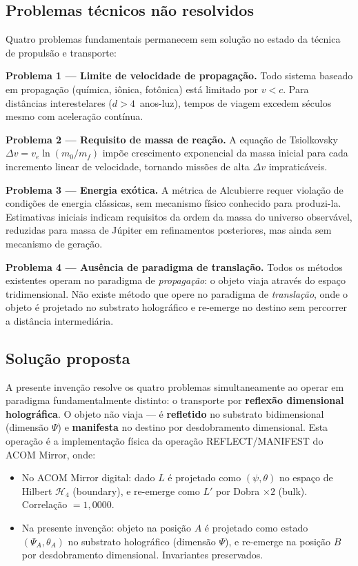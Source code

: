 \documentclass[12pt,a4paper]{article}
\begin{document}
\subsection{Problemas técnicos não resolvidos}

Quatro problemas fundamentais permanecem sem solução no estado
da técnica de propulsão e transporte:

\textbf{Problema 1 --- Limite de velocidade de propagação.}
Todo sistema baseado em propagação (química, iônica, fotônica)
está limitado por $v < c$. Para distâncias interestelares
($d > 4$~anos-luz), tempos de viagem excedem séculos mesmo
com aceleração contínua.

\textbf{Problema 2 --- Requisito de massa de reação.} A
equação de Tsiolkovsky $\Delta v = v_e \ln(m_0/m_f)$ impõe
crescimento exponencial da massa inicial para cada incremento
linear de velocidade, tornando missões de alta $\Delta v$
impraticáveis.

\textbf{Problema 3 --- Energia exótica.} A métrica de
Alcubierre requer violação de condições de energia clássicas,
sem mecanismo físico conhecido para produzi-la. Estimativas
iniciais indicam requisitos da ordem da massa do universo
observável, reduzidas para massa de Júpiter em refinamentos
posteriores, mas ainda sem mecanismo de geração.

\textbf{Problema 4 --- Ausência de paradigma de translação.}
Todos os métodos existentes operam no paradigma de
\textit{propagação}: o objeto viaja através do espaço
tridimensional. Não existe método que opere no paradigma de
\textit{translação}, onde o objeto é projetado no substrato
holográfico e re-emerge no destino sem percorrer a distância
intermediária.

\subsection{Solução proposta}

A presente invenção resolve os quatro problemas simultaneamente
ao operar em paradigma fundamentalmente distinto: o transporte
por \textbf{reflexão dimensional holográfica}. O objeto não
viaja --- é \textbf{refletido} no substrato bidimensional
(dimensão $\Psi$) e \textbf{manifesta} no destino por
desdobramento dimensional. Esta operação é a implementação
física da operação REFLECT/MANIFEST do ACOM Mirror, onde:

\begin{itemize}[nosep]
\item No ACOM Mirror digital: dado $L$ é projetado como
  $(\psi, \theta)$ no espaço de Hilbert $\mathcal{H}_4$
  (boundary), e re-emerge como $L'$ por Dobra $\times 2$
  (bulk). Correlação $= 1{,}0000$.
\item Na presente invenção: objeto na posição $A$ é projetado
  como estado $(\Psi_A, \theta_A)$ no substrato holográfico
  (dimensão $\Psi$), e re-emerge na posição $B$ por
  desdobramento dimensional. Invariantes preservados.
\end{itemize}
\end{document}
